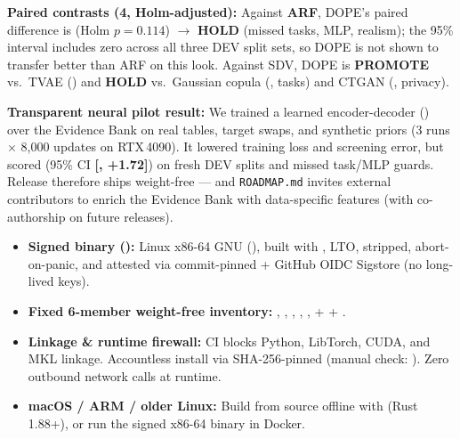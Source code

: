 \documentclass[8.5pt,letterpaper]{article}
\begin{document}
\noindent
\begin{minipage}[t]{0.486\textwidth}
  \vspace{0pt}
  {\fontsize{7.85}{9.9}\selectfont
  \textbf{Paired contrasts (4\x, Holm-adjusted):} Against \textbf{ARF}, DOPE's paired difference is \textbf{} (Holm $p=0.114$) $\rightarrow$ \textbf{HOLD} (missed tasks, MLP, realism); the 95\% interval includes zero across all three DEV split sets, so DOPE is not shown to transfer better than ARF on this look. Against SDV, DOPE is \textbf{PROMOTE} vs.\ TVAE () and \textbf{HOLD} vs.\ Gaussian copula (, tasks) and CTGAN (, privacy).

  \vspace{2.5pt}
  \textbf{Transparent neural pilot result:} We trained a learned encoder-decoder () over the Evidence Bank on real tables, target swaps, and synthetic priors (3 runs $\times$ 8,000 updates on RTX\,4090). It lowered training loss and screening error, but scored \textbf{} (95\% CI \textbf{[, +1.72]}) on fresh DEV splits and missed task/MLP guards. Release  therefore ships weight-free --- and \texttt{ROADMAP.md} invites external contributors to enrich the Evidence Bank with data-specific features (with co-authorship on future releases).
  }

  \vspace{3.5pt}
  {\fontsize{7.75}{9.8}\selectfont\raggedright
  \begin{itemize}[leftmargin=1.12em,itemsep=1.7pt,topsep=1.5pt]
    \item \textbf{Signed binary ():} Linux x86-64 GNU (), built with , LTO, stripped, abort-on-panic, and attested via commit-pinned  + GitHub OIDC Sigstore (no long-lived keys).
    \item \textbf{Fixed 6-member weight-free inventory:} , , , , ,  +  + .
    \item \textbf{Linkage \& runtime firewall:} CI blocks Python, LibTorch, CUDA, and MKL linkage. Accountless install via SHA-256-pinned  (manual check: ). Zero outbound network calls at runtime.
    \item \textbf{macOS / ARM / older Linux:} Build from source offline with  (Rust 1.88+), or run the signed x86-64 binary in  Docker.
  \end{itemize}
  }
\end{minipage}\hfill
\end{document}
